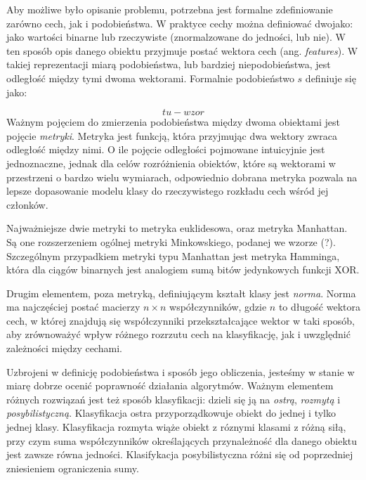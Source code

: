 \documentclass[12pt,a4paper,oneside]{report} %
\begin{document}
Aby możliwe było opisanie problemu, potrzebna jest formalne zdefiniowanie zarówno cech, jak i podobieństwa. W praktyce cechy można definiować dwojako: jako wartości binarne lub rzeczywiste (znormalzowane do jedności, lub nie). W ten sposób opis danego obiektu przyjmuje postać wektora cech (ang. \emph{features}). W takiej reprezentacji miarą podobieństwa, lub bardziej niepodobieństwa, jest odległość między tymi dwoma wektorami. Formalnie podobieństwo $s$ definiuje się jako:\par
    \begin{equation}
    tu-wzor
    \end{equation}
Ważnym pojęciem do zmierzenia podobieństwa między dwoma obiektami jest pojęcie \emph{metryki}. Metryka jest funkcją, która przyjmując dwa wektory zwraca odległość między nimi. O ile pojęcie odległości pojmowane intuicyjnie jest jednoznaczne, jednak dla celów rozróżnienia obiektów, które są wektorami w przestrzeni o bardzo wielu wymiarach, odpowiednio dobrana metryka pozwala na lepsze dopasowanie modelu klasy do rzeczywistego rozkładu cech wśród jej członków.\par

Najważniejsze dwie metryki to metryka euklidesowa, oraz metryka Manhattan. Są one rozszerzeniem ogólnej metryki Minkowskiego, podanej we wzorze (?). Szczególnym przypadkiem metryki typu Manhattan jest metryka Hamminga, która dla ciągów binarnych jest analogiem sumą bitów jedynkowych funkcji XOR. \par

Drugim elementem, poza metryką, definiującym kształt klasy jest \emph{norma}. Norma ma najczęściej postać macierzy $n \times n$ współczynników, gdzie $n$ to długość wektora cech, w której znajdują się współczynniki przekształcające wektor w taki sposób, aby zrównoważyć wpływ różnego rozrzutu cech na klasyfikację, jak i uwzględnić zależności między cechami. \par

Uzbrojeni w definicję podobieństwa i sposób jego obliczenia, jesteśmy w stanie w miarę dobrze ocenić poprawność działania algorytmów. Ważnym elementem różnych rozwiązań jest też sposób klasyfikacji: dzieli się ją na \emph{ostrą}, \emph{rozmytą} i \emph{posybilistyczną}. Klasyfikacja ostra przyporządkowuje obiekt do jednej i tylko jednej klasy. Klasyfikacja rozmyta wiąże obiekt z róznymi klasami z różną siłą, przy czym suma współczynników określających przynależność dla danego obiektu jest zawsze równa jedności. Klasifykacja posybilistyczna różni się od poprzedniej zniesieniem ograniczenia sumy.\par
\end{document}
